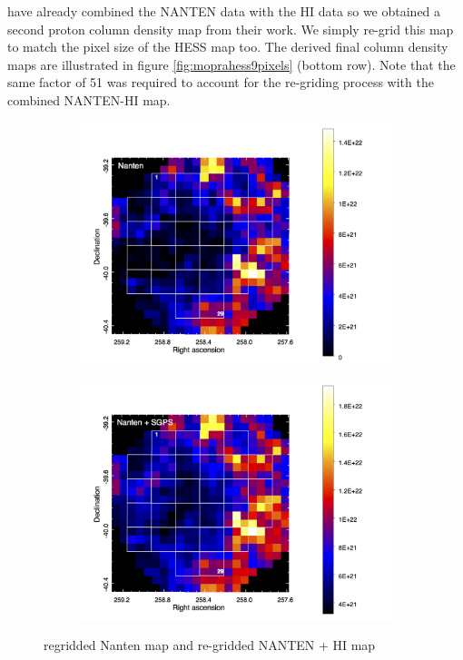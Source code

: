 \documentclass[12pt,a4paper]{article}
\begin{document}
\begin{appendices}
 \cite{2012ApJ...746...82F} have already combined the NANTEN data with the HI data so we obtained a second proton column density map from their work. We simply re-grid this map to match the pixel size of the HESS map too. The derived final column density maps are illustrated in figure \ref{fig:moprahess9pixels} (bottom row). Note that the same factor of 51 was required to account for the re-griding process with the combined NANTEN-HI map.
 \begin{figure}
	\begin{subfigure}{0.5\textwidth}
		\centering
		\includegraphics[width=0.85\linewidth, height=0.22\textheight]{nanten_9pixels}
	\end{subfigure}
	\begin{subfigure}{0.5\textwidth}
		\centering
		\includegraphics[width=0.85\linewidth, height=0.22\textheight]{nanten_HI_9pixels}
	\end{subfigure}
	\caption{regridded Nanten map and re-gridded NANTEN + HI map}
\end{figure}


\end{appendices}
\end{document}

